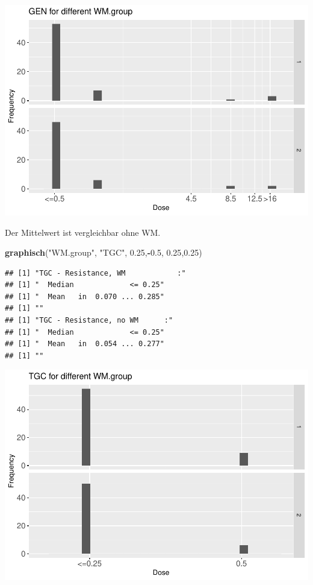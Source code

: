 \documentclass[
]{article}
\newenvironment{Shaded}{\begin{snugshade}}{\end{snugshade}}
\newcommand{\FloatTok}[1]{\textcolor[rgb]{0.00,0.00,0.81}{#1}}
\newcommand{\KeywordTok}[1]{\textcolor[rgb]{0.13,0.29,0.53}{\textbf{#1}}}
\newcommand{\NormalTok}[1]{#1}
\newcommand{\OperatorTok}[1]{\textcolor[rgb]{0.81,0.36,0.00}{\textbf{#1}}}
\newcommand{\StringTok}[1]{\textcolor[rgb]{0.31,0.60,0.02}{#1}}
\begin{document}
\includegraphics{Verteilungen_files/figure-latex/unnamed-chunk-35-1.pdf}

Der Mittelwert ist vergleichbar ohne WM.

\begin{Shaded}
\begin{Highlighting}[]
  \KeywordTok{graphisch}\NormalTok{(}\StringTok{"WM.group"}\NormalTok{, }\StringTok{"TGC"}\NormalTok{, }\FloatTok{0.25}\NormalTok{,}\OperatorTok{-}\FloatTok{0.5}\NormalTok{, }\FloatTok{0.25}\NormalTok{,}\FloatTok{0.25}\NormalTok{)  }
\end{Highlighting}
\end{Shaded}

\begin{verbatim}
## [1] "TGC - Resistance, WM            :"
## [1] "  Median             <= 0.25"
## [1] "  Mean   in  0.070 ... 0.285"
## [1] ""
## [1] "TGC - Resistance, no WM      :"
## [1] "  Median             <= 0.25"
## [1] "  Mean   in  0.054 ... 0.277"
## [1] ""
\end{verbatim}

\includegraphics{Verteilungen_files/figure-latex/unnamed-chunk-36-1.pdf}
\end{document}
